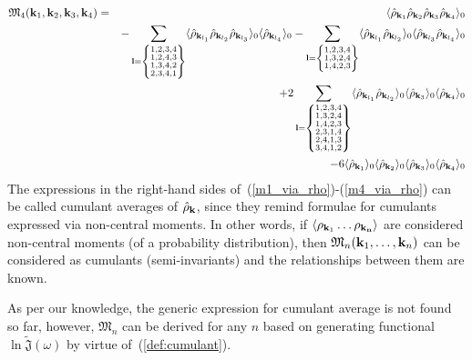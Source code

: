 \begin{eqnarray}
	\label{m4_via_rho}
	\mathfrak{M}_4(\vb k_1, \vb k_2, \vb k_3, \vb k_4) &=& 
	\langle \hat{\rho}_{\vb k_1} \hat{\rho}_{\vb k_2} \hat{\rho}_{\vb k_3} \hat{\rho}_{\vb k_4} \rangle_0 
	\nonumber\\
	&& - \sum_{\vb l = \left\{\substack{1,2,3,4 \\ 1,2,4,3 \\ 1,3,4,2 \\ 2,3,4,1}\right\}} 
	\langle \hat{\rho}_{\vb k_{l_1}} \hat{\rho}_{\vb k_{l_2}} \hat{\rho}_{\vb k_{l_3}} \rangle_0 \langle \hat{\rho}_{\vb k_{l_4}} \rangle_0
	-\sum_{\vb l = \left\{\substack{1,2,3,4 \\ 1,3,2,4 \\ 1,4,2,3 }\right\} } \langle \hat{\rho}_{\vb k_{l_1}} \hat{\rho}_{\vb k_{l_2}} \rangle_0 \langle \hat{\rho}_{\vb k_{l_3}} \hat{\rho}_{\vb k_{l_4}} \rangle_0 
	\nonumber\\
	&& +2 \sum_{\vb l = \left\{\substack{1,2,3,4 \\ 1,3,2,4 \\ 1,4,2,3 \\ 2,3,1,4 \\ 2,4,1,3 \\ 3,4,1,2 }\right\} } \langle \hat{\rho}_{\vb k_{l_1}} \hat{\rho}_{\vb k_{l_2}} \rangle_0 \langle\hat{\rho}_{\vb k_3} \rangle_0 \langle\hat{\rho}_{\vb k_4} \rangle_0
	\nonumber\\
	&& -6 \langle \hat{\rho}_{\vb k_1} \rangle_0 \langle\hat{\rho}_{\vb k_2} \rangle_0 \langle\hat{\rho}_{\vb k_3} \rangle_0 \langle\hat{\rho}_{\vb k_4} \rangle_0
\end{eqnarray}
The expressions in the right-hand sides of~(\ref{m1_via_rho})-(\ref{m4_via_rho}) can be called cumulant averages of $\hat{\rho}_{\vb k}$, since they remind formulae for cumulants expressed via non-central moments. In other words, if $\langle\rho_{\vb k_1} \dotsc \rho_{\bf k_n} \rangle$ are considered non-central moments (of a probability distribution), then $\mathfrak{M}_n(\vb k_1, \dotsc, \vb k_n)$ can be considered as cumulants (semi-invariants) and the relationships between them are known\cite{stuart2010kendall}.

As per our knowledge, the generic expression for cumulant average is not found so far, however, $\mathfrak{M}_n$ can be derived for any $n$ based on generating functional $\ln \tilde{\mathfrak{J}}(\omega)$ by virtue of~(\ref{def:cumulant}).

